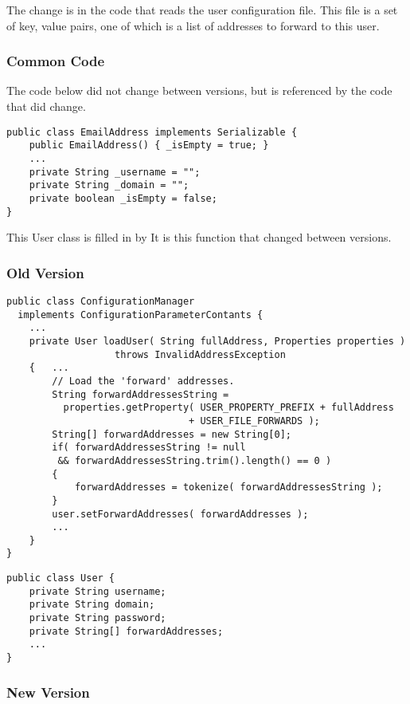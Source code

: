 The change is in the code that reads the user configuration file.
This file is a set of key, value pairs, one of which is a list of
addresses to forward to this user.

\subsubsection{Common Code}

The code below did not change between versions, but is referenced by
the code that did change.

\begin{lstlisting}
public class EmailAddress implements Serializable {
    public EmailAddress() { _isEmpty = true; }
    ...
    private String _username = "";
    private String _domain = "";
    private boolean _isEmpty = false;
}   
\end{lstlisting}

This User class is filled in by 
It is this function that changed between versions.

\subsubsection{Old Version}
\begin{lstlisting}
public class ConfigurationManager
  implements ConfigurationParameterContants {
    ...
    private User loadUser( String fullAddress, Properties properties )
                   throws InvalidAddressException
    {   ...
        // Load the 'forward' addresses.
        String forwardAddressesString =
          properties.getProperty( USER_PROPERTY_PREFIX + fullAddress 
                                + USER_FILE_FORWARDS );
        String[] forwardAddresses = new String[0];
        if( forwardAddressesString != null 
         && forwardAddressesString.trim().length() == 0 )
        {
            forwardAddresses = tokenize( forwardAddressesString );
        }
        user.setForwardAddresses( forwardAddresses );
        ...
    }
}
\end{lstlisting}

\begin{lstlisting}
public class User {
    private String username;
    private String domain;
    private String password;
    private String[] forwardAddresses;
    ...
}
\end{lstlisting}

\subsubsection{New Version}

